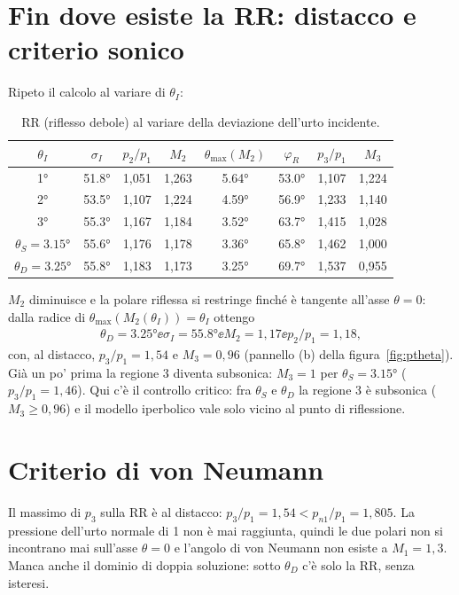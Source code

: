 \section*{Fin dove esiste la RR: distacco e criterio sonico}
Ripeto il calcolo al variare di $\theta_I$:

\begin{table}[H]
\centering\small
\begin{tabular}{cccccccc}
\toprule
$\theta_I$ & $\sigma_I$ & $p_2/p_1$ & $M_2$ & $\theta_{\max}(M_2)$ & $\varphi_R$ & $p_3/p_1$ & $M_3$ \\
\midrule
\ang{1}    & \ang{51.8} & 1,051 & 1,263 & \ang{5.64} & \ang{53.0} & 1,107 & 1,224 \\
\ang{2}    & \ang{53.5} & 1,107 & 1,224 & \ang{4.59} & \ang{56.9} & 1,233 & 1,140 \\
\ang{3}    & \ang{55.3} & 1,167 & 1,184 & \ang{3.52} & \ang{63.7} & 1,415 & 1,028 \\
$\theta_S=\ang{3.15}$ & \ang{55.6} & 1,176 & 1,178 & \ang{3.36} & \ang{65.8} & 1,462 & 1,000 \\
$\theta_D=\ang{3.25}$ & \ang{55.8} & 1,183 & 1,173 & \ang{3.25} & \ang{69.7} & 1,537 & 0,955 \\
\bottomrule
\end{tabular}
\caption{RR (riflesso debole) al variare della deviazione dell'urto incidente.}
\end{table}

$M_2$ diminuisce e la polare riflessa si restringe finché è tangente all'asse $\theta=0$: dalla radice di
$\theta_{\max}(M_2(\theta_I))=\theta_I$ ottengo
\begin{gather*}
\theta_D=\ang{3.25}\ee \sigma_I=\ang{55.8}\ee M_2=1{,}17\ee p_2/p_1=1{,}18,
\end{gather*}
con, al distacco, $p_3/p_1=1{,}54$ e $M_3=0{,}96$ (pannello (b) della figura~\ref{fig:ptheta}). Già un po' prima la
regione 3 diventa subsonica: $M_3=1$ per $\theta_S=\ang{3.15}$ ($p_3/p_1=1{,}46$). Qui c'è il controllo critico:
fra $\theta_S$ e $\theta_D$ la regione 3 è subsonica ($M_3\ge0{,}96$) e il modello iperbolico vale solo vicino al
punto di riflessione.

\section*{Criterio di von Neumann}
Il massimo di $p_3$ sulla RR è al distacco: $p_3/p_1=1{,}54<p_{n1}/p_1=1{,}805$. La pressione dell'urto normale di 1
non è mai raggiunta, quindi le due polari non si incontrano mai sull'asse $\theta=0$ e l'angolo di von Neumann non
esiste a $M_1=1{,}3$. Manca anche il dominio di doppia soluzione: sotto $\theta_D$ c'è solo la RR, senza isteresi.

